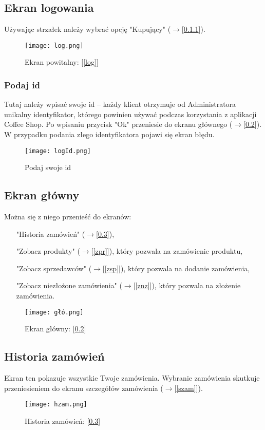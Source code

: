 \subsection{Ekran logowania}
Używając strzałek należy wybrać opcję "Kupujący" ($\rightarrow$[\ref{logId}]).
\label{log}
\begin{figure}
  \centering
  \texttt{[image: log.png]}
  \caption{Ekran powitalny: [\ref{log}]}
  \label{logI}
\end{figure}
\subsubsection{Podaj id}
\label{logId}
Tutaj należy wpisać swoje id -- każdy klient otrzymuje od Administratora unikalny identyfikator, którego powinien używać podczas korzystania z aplikacji Coffee Shop. Po wpisaniu przycisk "Ok" przeniesie do ekranu głównego ($\rightarrow$[\ref{głó}]). W przypadku podania złego identyfikatora pojawi się ekran błędu.
\begin{figure}
  \centering
  \texttt{[image: logId.png]}
  \caption{Podaj swoje id}
  \label{logIdI}
\end{figure}
\subsection{Ekran główny}
\label{głó}
Można się z niego przenieść do ekranów: 
\begin{itemize}[leftmargin=5cm]
\item["Historia zamówień"]($\rightarrow$[\ref{hzam}]), 
\item["Zobacz produkty"]($\rightarrow$[\ref{zpr}]), który pozwala na zamówienie produktu, 
\item["Zobacz sprzedawców"]($\rightarrow$[\ref{zsp}]), który pozwala na dodanie zamówienia,
\item["Zobacz niezłożone zamówienia"]($\rightarrow$[\ref{znz}]), który pozwala na złożenie zamówienia.
\end{itemize}
\begin{figure}
  \centering
  \texttt{[image: głó.png]}
  \caption{Ekran główny: [\ref{głó}]}
  \label{głóI}
\end{figure}
\subsection{Historia zamówień}
\label{hzam}
Ekran ten pokazuje wszystkie Twoje zamówienia.
Wybranie zamówienia skutkuje przeniesieniem do ekranu szczegółów zamówienia ($\rightarrow$[\ref{szam}]).
\begin{figure}
  \centering
  \texttt{[image: hzam.png]}
  \caption{Historia zamówień: [\ref{hzam}]}
  \label{hzamI}
\end{figure}
